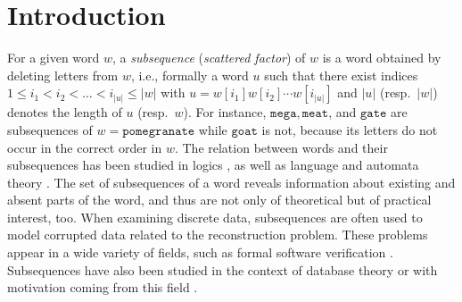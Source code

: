 \documentclass[runningheads,UKenglish,cleveref, autoref, thm-restate]{llncs}
\begin{document}

	\section{Introduction}
For a given word $w$, a \emph{subsequence} (\emph{scattered factor}) of $w$ is a 
word obtained by deleting letters from $w$, i.e.,  formally a word $u$ such that there exist  
indices $1 \leq i_1 < i_2 < \dots < i_{\vert u \vert} \leq \vert w \vert$ with $u = w[i_1] w[i_2] 
\cdots w[i_{\vert u \vert}]$ and $\vert u \vert$ (resp.~$\vert w \vert$) denotes the length of $u$ 
(resp.~$w$). For instance, $\mathtt{mega}, \mathtt{meat}$, and $\mathtt{gate}$ are subsequences 
of $w=\mathtt{pomegranate}$ while $\mathtt{goat}$ is not, because 
its letters do not occur in the correct order in $w$.
The relation between words and their subsequences has been studied in
logics \cite{DBLP:conf/lics/HalfonSZ17,10.1007/978-3-030-17127-8_20}, as well as language and automata theory \cite{DBLP:conf/isaac/AdamsonFHKMN23,DBLP:journals/ipl/KarandikarKS15,DBLP:journals/lmcs/KarandikarS19,simon1972hierarchies,DBLP:conf/automata/Simon75,zetzsche:LIPIcs.ICALP.2016.123}.
The set of subsequences of a word reveals information about existing and absent parts of the word, and thus are not only of theoretical but of practical interest, too. When examining discrete data, subsequences are often used to model corrupted data \cite{dress2005reconstructing,DBLP:journals/ijfcs/FleischmannLMNR21,DBLP:conf/dlt/Manuch99} related to the reconstruction problem. These problems appear in a wide variety of fields, such as 
formal software verification \cite{DBLP:conf/lics/HalfonSZ17,zetzsche:LIPIcs.ICALP.2016.123}. Subsequences have also been studied in the context of database theory \cite{artikis2017complex,Kleest-Meissner22,Kleest-Meissner23,SchmidSIGMOD} or with motivation coming from this field \cite{DayKMS22,Goettingen2023words,ManeaRS24}. 
\end{document}
